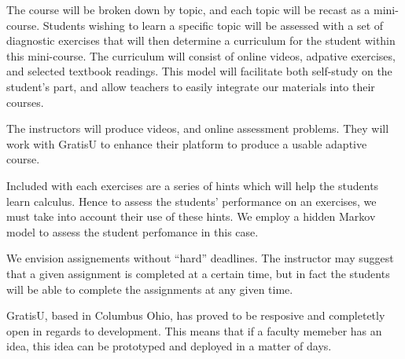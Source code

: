
The course will be broken down by topic, and each topic will be recast
as a mini-course. Students wishing to learn a specific topic will be
assessed with a set of diagnostic exercises that will then determine a
curriculum for the student within this mini-course. The curriculum
will consist of online videos, adpative exercises, and selected
textbook readings. This model will facilitate both self-study on the
student's part, and allow teachers to easily integrate our materials
into their courses.


The instructors will produce videos, and online assessment
problems. They will work with GratisU to enhance their platform to
produce a usable adaptive course. 



Included with each exercises are a series of hints which will help the
students learn calculus.  Hence to assess the students' performance on
an exercises, we must take into account their use of these hints. We
employ a hidden Markov model to assess the student perfomance in this
case.



We envision assignements without ``hard'' deadlines. The instructor
may suggest that a given assignment is completed at a certain time,
but in fact the students will be able to complete the assignments at
any given time.



GratisU, based in Columbus Ohio, has proved to be resposive and
completetly open in regards to development. This means that if a
faculty memeber has an idea, this idea can be prototyped and deployed
in a matter of days.


